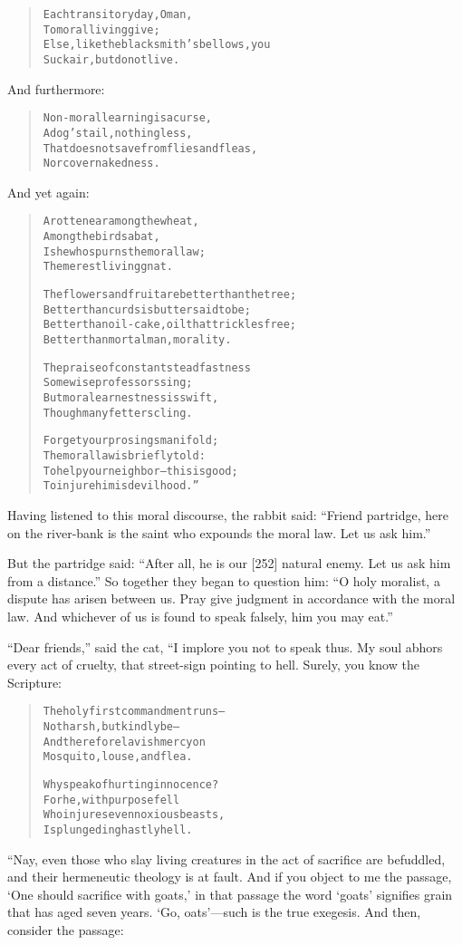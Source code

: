 \documentclass[article, twoside, 14pt]{memoir}
\renewenvironment{verbatim}{%
\begin{quote}%
\vskip -10pt%
\begin{alltt}\normalfont\large}{\end{alltt}%
\end{quote}%
\vskip -10pt
} %
\begin{document}
\begin{verbatim}
Each transitory day, O man,
    To moral living give;
Else, like the blacksmith's bellows, you
    Suck air, but do not live.
\end{verbatim}
And furthermore:

\begin{verbatim}
Non-moral learning is a curse,
    A dog's tail, nothing less,
That does not save from flies and fleas,
    Nor cover nakedness.
\end{verbatim}
And yet again:

\begin{verbatim}
A rotten ear among the wheat,
    Among the birds a bat,
Is he who spurns the moral law;
    The merest living gnat.

The flowers and fruit are better than the tree;
Better than curds is butter said to be;
Better than oil-cake, oil that trickles free;
Better than mortal man, morality.

The praise of constant steadfastness
    Some wise professors sing;
But moral earnestness is swift,
    Though many fetters cling.

Forget your prosings manifold;
The moral law is briefly told:
To help your neighbor--this is good;
To injure him is devilhood.”
\end{verbatim}
Having listened to this moral discourse, the rabbit said:
``Friend partridge, here on the river-bank is the saint who expounds the moral law. Let us ask him.''

But the partridge said:
``After all, he is our [252] natural enemy. Let us ask him from a distance.''
So together they began to question him:
``O holy moralist, a dispute has arisen between us. Pray give judgment in accordance with the moral law. And whichever of us is found to speak falsely, him you may eat.''

``Dear friends,'' said the cat, “I implore you not to speak thus.
My soul abhors every act of cruelty, that street-sign pointing to
hell. Surely, you know the Scripture:

\begin{verbatim}
The holy first commandment runs--
    Not harsh, but kindly be--
And therefore lavish mercy on
    Mosquito, louse, and flea.

Why speak of hurting innocence?
    For he, with purpose fell
Who injures even noxious beasts,
    Is plunged in ghastly hell.
\end{verbatim}
“Nay, even those who slay living creatures in the act of sacrifice
are befuddled, and their hermeneutic theology is at fault. And if
you object to me the passage, `One should sacrifice with goats,' in
that passage the word `goats' signifies grain that has aged seven
years. `Go, oats'---such is the true exegesis. And then, consider
the passage:
\end{document}
